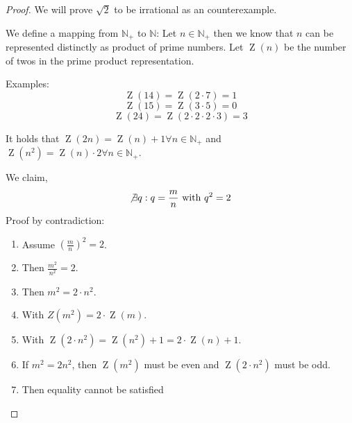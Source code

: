 \documentclass[a4paper,landscape,twocolumn]{article}
\theoremstyle{definition}
\begin{document}
\begin{proof}
  We will prove $\sqrt{2}$ to be irrational as an counterexample.

  We define a mapping from $\mathbb N_+$ to $\mathbb N$:
  Let $n \in \mathbb N_+$ then we know that $n$ can be represented distinctly
  as product of prime numbers. Let $\operatorname{Z}(n)$ be the number of twos
  in the prime product representation.

  Examples:
  \[ \operatorname{Z}(14) = \operatorname{Z}(2 \cdot 7) = 1 \]
  \[ \operatorname{Z}(15) = \operatorname{Z}(3 \cdot 5) = 0 \]
  \[ \operatorname{Z}(24) = \operatorname{Z}(2 \cdot 2 \cdot 2 \cdot 3) = 3 \]

  It holds that $\operatorname{Z}(2n) = \operatorname{Z}(n) + 1 \forall n \in \mathbb N_+$
  and $\operatorname{Z}(n^2) = \operatorname{Z}(n) \cdot 2 \forall n \in \mathbb N_+$.

  We claim,
  \[ \not\exists q: q = \frac mn \text{ with } q^2 = 2 \]
  Proof by contradiction:
  \begin{enumerate}
    \item Assume $\left(\frac mn\right)^2 = 2$.
    \item Then $\frac{m^2}{n^2} = 2$.
    \item Then $m^2 = 2 \cdot n^2$.
    \item With $Z(m^2) = 2\cdot \operatorname{Z}(m)$.
    \item With $\operatorname{Z}(2\cdot n^2) = \operatorname{Z}(n^2) + 1 = 2 \cdot \operatorname{Z}(n) + 1$.
    \item If $m^2 = 2n^2$, then $\operatorname{Z}(m^2)$ must be even and $\operatorname{Z}(2\cdot n^2)$ must be odd.
    \item Then equality cannot be satisfied \lightning
  \end{enumerate}
\end{proof}
\end{document}
